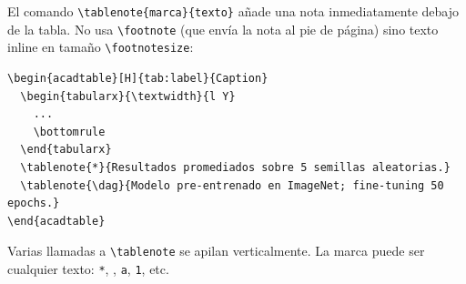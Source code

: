El comando \texttt{\textbackslash tablenote\{marca\}\{texto\}} añade una
nota inmediatamente debajo de la tabla. No usa \texttt{\textbackslash footnote}
(que envía la nota al pie de página) sino texto inline en tamaño
\texttt{\textbackslash footnotesize}:

\begin{lstlisting}[style=latex, frame=none, numbers=none]
\begin{acadtable}[H]{tab:label}{Caption}
  \begin{tabularx}{\textwidth}{l Y}
    ...
    \bottomrule
  \end{tabularx}
  \tablenote{*}{Resultados promediados sobre 5 semillas aleatorias.}
  \tablenote{\dag}{Modelo pre-entrenado en ImageNet; fine-tuning 50 epochs.}
\end{acadtable}
\end{lstlisting}

Varias llamadas a \texttt{\textbackslash tablenote} se apilan verticalmente.
La marca puede ser cualquier texto: \texttt{*}, \texttt{\dag},
\texttt{a}, \texttt{1}, etc.

\printbibliography[heading=subbibliography]
